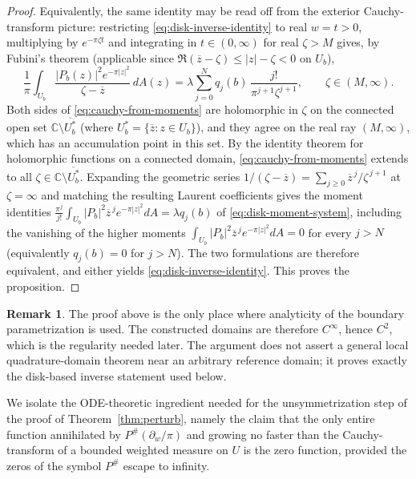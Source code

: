 \documentclass[a4paper,11pt,reqno]{amsart}
\numberwithin{equation}{section}
\theoremstyle{plain} %
\theoremstyle{definition} %
\newtheorem{remark}{Remark}[section]
\theoremstyle{remark}
\newcommand{\C}{\mathbb{C}}
\begin{document}
\begin{proof}
Equivalently, the same identity may be read off from the exterior
Cauchy-transform picture: restricting \eqref{eq:disk-inverse-identity} to
real \(w=t>0\), multiplying by \(e^{-\pi\zeta t}\) and integrating in
\(t\in(0,\infty)\) for real \(\zeta>M\) gives, by Fubini's theorem (applicable
since \(\Re(\overline z-\zeta)\le|z|-\zeta<0\) on \(U_b\)),
\begin{equation}\label{eq:cauchy-from-moments}
\frac1\pi\int_{U_b}\frac{|P_b(z)|^2 e^{-\pi|z|^2}}{\zeta-\overline z}\,dA(z)
=
\lambda\sum_{j=0}^N q_j(b)\,\frac{j!}{\pi^{j+1}\zeta^{j+1}},
\qquad \zeta\in(M,\infty).
\end{equation}
Both sides of \eqref{eq:cauchy-from-moments} are holomorphic in \(\zeta\) on
the connected open set \(\C\setminus\overline{U_b^*}\) (where
\(U_b^*=\{\overline z:z\in U_b\}\)), and they agree on the real ray
\((M,\infty)\), which has an accumulation point in this set. By the
identity theorem for holomorphic functions on a connected domain,
\eqref{eq:cauchy-from-moments} extends to all
\(\zeta\in\C\setminus\overline{U_b^*}\). Expanding the geometric series
\(1/(\zeta-\overline z)=\sum_{j\ge0}\overline z^{\,j}/\zeta^{\,j+1}\) at
\(\zeta=\infty\) and matching the resulting Laurent coefficients gives the
moment identities \(\frac{\pi^j}{j!}\int_{U_b}|P_b|^2\overline z^{\,j}e^{-\pi|z|^2}dA=\lambda q_j(b)\)
of \eqref{eq:disk-moment-system}, including the vanishing of the higher
moments \(\int_{U_b}|P_b|^2\overline z^{\,j}e^{-\pi|z|^2}dA=0\) for every
\(j>N\) (equivalently \(q_j(b)=0\) for \(j>N\)). The two formulations are
therefore equivalent, and either yields \eqref{eq:disk-inverse-identity}.
This proves the proposition.
\end{proof}

\begin{remark}
The proof above is the only place where analyticity of the boundary
parametrization is used. The constructed domains are therefore \(C^\infty\),
hence \(C^2\), which is the regularity needed later. The argument does not
assert a general local quadrature-domain theorem near an arbitrary reference
domain; it proves exactly the disk-based inverse statement used below.
\end{remark}

We isolate the ODE-theoretic ingredient needed for the unsymmetrization step
of the proof of Theorem~\ref{thm:perturb}, namely the claim that the only
entire function annihilated by \(P^\#(\partial_w/\pi)\) and growing no faster
than the Cauchy-transform of a bounded weighted measure on \(U\) is the zero
function, provided the zeros of the symbol \(P^\#\) escape to infinity.
\end{document}
